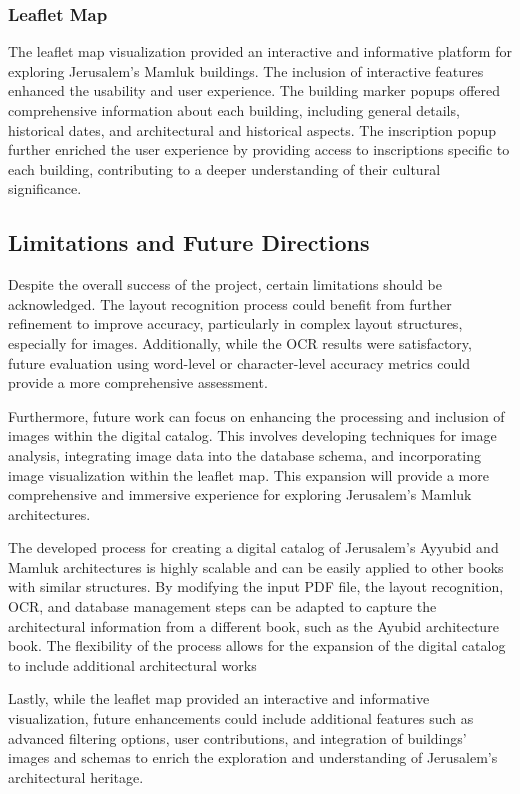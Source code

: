 \subsubsection{Leaflet Map}

The leaflet map visualization provided an interactive and informative platform for exploring Jerusalem's Mamluk buildings. The inclusion of interactive features enhanced the usability and user experience. The building marker popups offered comprehensive information about each building, including general details, historical dates, and architectural and historical aspects. The inscription popup further enriched the user experience by providing access to inscriptions specific to each building, contributing to a deeper understanding of their cultural significance.

\subsection{Limitations and Future Directions}

Despite the overall success of the project, certain limitations should be acknowledged. The layout recognition process could benefit from further refinement to improve accuracy, particularly in complex layout structures, especially for images. Additionally, while the OCR results were satisfactory, future evaluation using word-level or character-level accuracy metrics could provide a more comprehensive assessment.

Furthermore, future work can focus on enhancing the processing and inclusion of images within the digital catalog. This involves developing techniques for image analysis, integrating image data into the database schema, and incorporating image visualization within the leaflet map. This expansion will provide a more comprehensive and immersive experience for exploring Jerusalem's Mamluk architectures.

The developed process for creating a digital catalog of Jerusalem's Ayyubid and Mamluk architectures is highly scalable and can be easily applied to other books with similar structures. By modifying the input PDF file, the layout recognition, OCR, and database management steps can be adapted to capture the architectural information from a different book, such as the Ayubid architecture book. The flexibility of the process allows for the expansion of the digital catalog to include additional architectural works

Lastly, while the leaflet map provided an interactive and informative visualization, future enhancements could include additional features such as advanced filtering options, user contributions, and integration of buildings' images and schemas to enrich the exploration and understanding of Jerusalem's architectural heritage.

